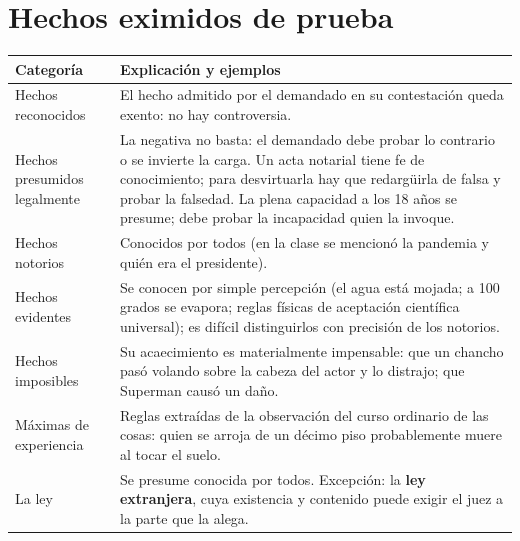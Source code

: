 \documentclass[12pt,oneside]{book}
\renewcommand{\arraystretch}{1.15}
\begin{document}
\section{Hechos eximidos de prueba}

\begin{table}[H]
\centering
\renewcommand{\arraystretch}{1.25}
\begin{tabularx}{\textwidth}{>{\RaggedRight\arraybackslash}p{}>{\RaggedRight\arraybackslash}X}
\toprule
\textbf{Categoría} & \textbf{Explicación y ejemplos} \\
\midrule
Hechos reconocidos & El hecho admitido por el demandado en su contestación queda exento: no hay controversia. \\
\addlinespace
Hechos presumidos legalmente & La negativa no basta: el demandado debe probar lo contrario o se invierte la carga. Un acta notarial tiene fe de conocimiento; para desvirtuarla hay que redargüirla de falsa y probar la falsedad. La plena capacidad a los 18 años se presume; debe probar la incapacidad quien la invoque. \\
\addlinespace
Hechos notorios & Conocidos por todos (en la clase se mencionó la pandemia y quién era el presidente). \\
\addlinespace
Hechos evidentes & Se conocen por simple percepción (el agua está mojada; a 100 grados se evapora; reglas físicas de aceptación científica universal); es difícil distinguirlos con precisión de los notorios. \\
\addlinespace
Hechos imposibles & Su acaecimiento es materialmente impensable: que un chancho pasó volando sobre la cabeza del actor y lo distrajo; que Superman causó un daño. \\
\addlinespace
Máximas de experiencia & Reglas extraídas de la observación del curso ordinario de las cosas: quien se arroja de un décimo piso probablemente muere al tocar el suelo. \\
\addlinespace
La ley & Se presume conocida por todos. Excepción: la \textbf{ley extranjera}, cuya existencia y contenido puede exigir el juez a la parte que la alega. \\
\bottomrule
\end{tabularx}
\end{table}
\end{document}

